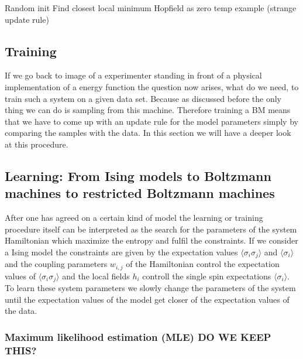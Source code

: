 \documentclass[nofootinbib, superscriptaddress, prl]{revtex4}
\begin{document}
Random init
Find closest local minimum
Hopfield as zero temp example (strange update rule)

\subsection{Training}

If we go back to image of a experimenter standing in front of a physical implementation of a energy function the question now arises, what do we need, to train such a system on a given data set. Because as discussed before the only thing we can do is sampling from this machine. Therefore training a BM means that we have to come up with an update rule for the model parameters simply by comparing the samples with the data. In this section we will have a deeper look at this procedure. 

\subsection{Learning: From Ising models to Boltzmann machines to restricted Boltzmann machines}

After one has agreed on a certain kind of model the learning or training procedure itself can be interpreted as the search for the parameters of the system Hamiltonian which maximize the entropy and fulfil the constraints. If we consider a Ising model the constraints are given by the expectation values $\langle \sigma_i \sigma_j \rangle $
 and $\langle \sigma_i \rangle$ and the coupling parameters $w_{i,j}$ of the Hamiltonian control the expectation values of $\langle \sigma_i \sigma_j \rangle $ and the local fields $h_i$ controll the single spin expectations $\langle \sigma_i \rangle$.
To learn these system parameters we slowly change the parameters of the system until the expectation values of the model get closer of the expectation values of the data. 

\subsubsection{Maximum likelihood estimation (MLE) DO WE KEEP THIS?}
\end{document}
